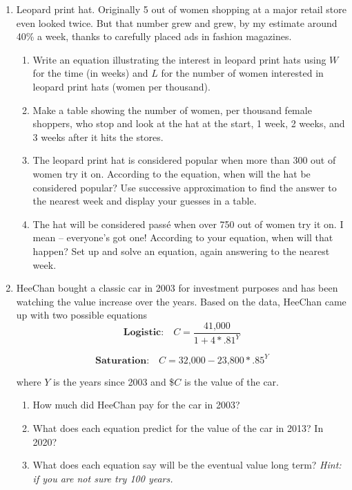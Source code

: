 \begin{enumerate} 

\item Leopard print hat. Originally 5 out of  women shopping at a major retail store even looked twice.  But that number grew and grew, by my estimate around 40\% a week, thanks to carefully placed ads in fashion magazines.
\begin{enumerate}
\item Write an equation illustrating the interest in leopard print hats using $W$ for the time (in weeks) and $L$ for the number of women interested in leopard print hats (women per thousand). 
\vfill
\item Make a table showing the number of women, per thousand female shoppers, who stop and look at the hat at the start, 1 week, 2 weeks, and 3 weeks after it hits the stores. 
\vfill
\item The leopard print hat is considered popular when more than 300 out of  women try it on.  According to the equation, when will the hat be considered popular?  Use successive approximation to find the answer to the nearest week and display your guesses in a table. 
\vfill
\vfill
\item The hat will be considered pass\'e when over 750 out of  women try it on.  I mean -- everyone's got one!  According to your equation, when will that happen?  Set up and solve an equation, again answering to the nearest week. 
\vfill
\vfill
\end{enumerate} 

\newpage

\item HeeChan bought a classic car in 2003 for investment purposes and has been watching the value increase over the years.  Based on the data, HeeChan came up with two possible equations
$$\textbf{Logistic:} \quad C= \frac{\text{41,000}}{1+4\ast.81^Y}$$

$$ \textbf{Saturation:} \quad C = \text{32,000}-\text{23,800}\ast.85^Y$$

where $Y$ is the years since 2003 and \$$C$ is the value of the car.

\begin{enumerate}
\item How much did HeeChan pay for the car in 2003? 
\vfill
\item What does each equation predict for the value of the car in 2013?  In 2020?   
\vfill
\item What does each equation say will be the eventual value long term?  \emph{Hint:   if you are not sure try 100 years.}  
\vfill
\end{enumerate} 


\end{enumerate}
